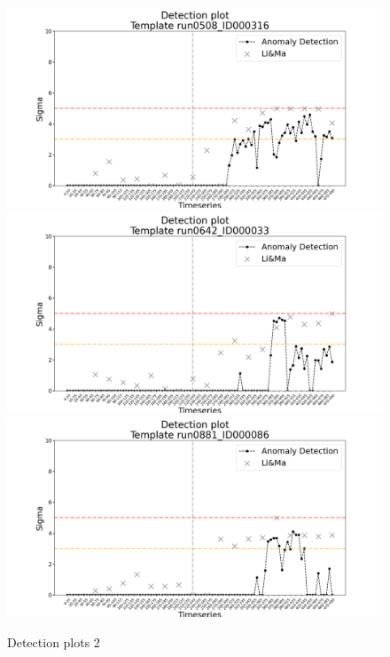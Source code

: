 \begin{figure}[!htb]
    \includegraphics[width=1\textwidth]{figures/experiments/detection_plots/detection_plot_run0508_ID000316_testset_e.png}\hfill
    \\[\smallskipamount]

    \includegraphics[width=1\textwidth]{figures/experiments/detection_plots/detection_plot_run0642_ID000033_testset_e.png}\hfill
    \\[\smallskipamount]
    
    \includegraphics[width=1\textwidth]{figures/experiments/detection_plots/detection_plot_run0881_ID000086_testset_e.png}\hfill
    \\[\smallskipamount]
    \caption{Detection plots 2}\label{fig:detection-plots-2}
\end{figure}
